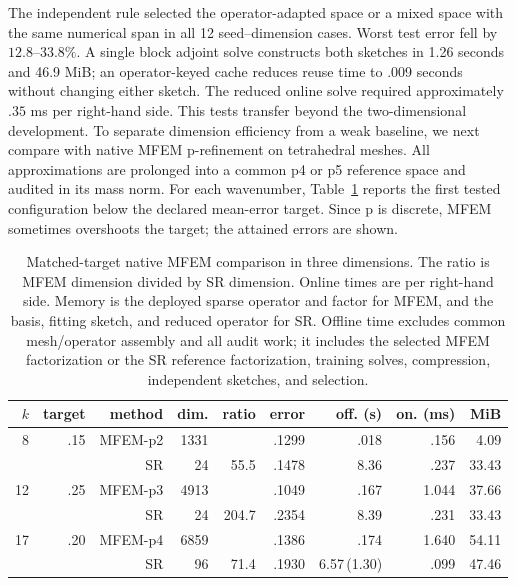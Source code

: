 \documentclass[11pt]{article}
\numberwithin{algorithm}{section}
\theoremstyle{definition}\newtheorem{definition}[theorem]{Definition}
\theoremstyle{remark}\newtheorem{remark}[theorem]{Remark}
\begin{document}
The independent rule selected the operator-adapted space or a mixed space
with the same numerical span in all 12 seed--dimension cases.  Worst test
error fell by $12.8$--$33.8\%$.  A single block adjoint solve constructs both
sketches in 1.26 seconds and 46.9 MiB; an operator-keyed cache reduces reuse
time to .009 seconds without changing either sketch.  The reduced
online solve required approximately $.35$ ms per right-hand side.  This tests
transfer beyond the two-dimensional development.  To separate dimension
efficiency from a weak baseline, we next compare with native MFEM
p-refinement on tetrahedral meshes.  All approximations are prolonged into a
common p4 or p5 reference space and audited in its mass norm.  For each
wavenumber, Table~\ref{tab:helmholtz-3d-mfem-target} reports the first tested
configuration below the declared mean-error target.  Since p is discrete,
MFEM sometimes overshoots the target; the attained errors are shown.

\begin{table}[H]
\centering
\caption{Matched-target native MFEM comparison in three dimensions.  The ratio
is MFEM dimension divided by SR dimension.  Online times are per right-hand
side.  Memory is the deployed sparse operator and factor for MFEM, and the
basis, fitting sketch, and reduced operator for SR.  Offline time excludes
common mesh/operator assembly and all audit work; it includes the selected
MFEM factorization or the SR reference factorization, training solves,
compression, independent sketches, and selection.}
\label{tab:helmholtz-3d-mfem-target}
\small
\begin{tabular}{rrrrrrrrr}
\toprule
$k$ & target & method & dim. & ratio & error & off. (s) & on. (ms) & MiB\\
\midrule
8  & .15 & MFEM-p2 & 1331 &      & .1299 & .018 & .156 & 4.09\\
   &     & SR      &   24 & 55.5 & .1478 & 8.36 & .237 & 33.43\\
12 & .25 & MFEM-p3 & 4913 &      & .1049 & .167 & 1.044 & 37.66\\
   &     & SR      &   24 & 204.7 & .2354 & 8.39 & .231 & 33.43\\
17 & .20 & MFEM-p4 & 6859 &      & .1386 & .174 & 1.640 & 54.11\\
   &     & SR      &   96 & 71.4 & .1930 & 6.57\,(1.30) & .099 & 47.46\\
\bottomrule
\end{tabular}
\end{table}
\end{document}
